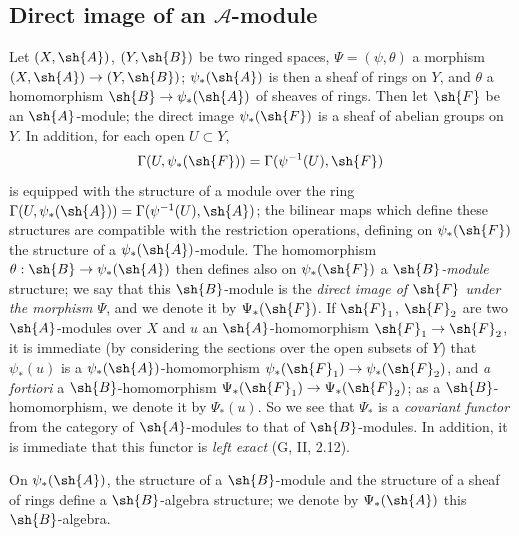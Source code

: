 \subsection{Direct image of an $\mathcal{A}$-module}
\label{subsection:0.4.2}

\begin{env}[4.2.1]
\label{0.4.2.1}
Let $(X,\sh{A})$, $(Y,\sh{B})$ be two ringed spaces, $\Psi=(\psi,\theta)$ a
morphism $(X,\sh{A})\to(Y,\sh{B})$; $\psi_*(\sh{A})$ is then a sheaf of rings on
$Y$, and $\theta$ a homomorphism $\sh{B}\to\psi_*(\sh{A})$ of sheaves of rings.
Then let $\sh{F}$ be an $\sh{A}$-module; the direct image $\psi_*(\sh{F})$ is a
sheaf of abelian groups on $Y$. In addition, for each open $U\subset Y$,
\[
  \Gamma(U,\psi_*(\sh{F}))=\Gamma(\psi^{-1}(U),\sh{F})
\]
is equipped with the structure of a module over the ring
$\Gamma(U,\psi_*(\sh{A}))=\Gamma(\psi^{-1}(U),\sh{A})$; the bilinear maps which
define these structures are compatible with the restriction operations, defining
on $\psi_*(\sh{F})$ the structure of a $\psi_*(\sh{A})$-module. The homomorphism
$\theta:\sh{B}\to\psi_*(\sh{A})$ then defines also on $\psi_*(\sh{F})$ a
\emph{$\sh{B}$-module} structure; we say that this
$\sh{B}$-module is the \emph{direct image of $\sh{F}$ under the morphism
$\Psi$}, and we denote it by $\Psi_*(\sh{F})$. If $\sh{F}_1$, $\sh{F}_2$ are two
$\sh{A}$-modules over $X$ and $u$ an $\sh{A}$-homomorphism
$\sh{F}_1\to\sh{F}_2$, it is immediate (by considering the sections over the
open subsets of $Y$) that $\psi_*(u)$ is a $\psi_*(\sh{A})$-homomorphism
$\psi_*(\sh{F}_1)\to\psi_*(\sh{F}_2)$, and \emph{a fortiori} a
$\sh{B}$-homomorphism $\Psi_*(\sh{F}_1)\to\Psi_*(\sh{F}_2)$; as a
$\sh{B}$-homomorphism, we denote it by $\Psi_*(u)$. So we see that $\Psi_*$ is a
\emph{covariant functor} from the category of $\sh{A}$-modules to that of
$\sh{B}$-modules. In addition, it is immediate that this functor is \emph{left
exact} (G, II, 2.12).

On $\psi_*(\sh{A})$, the structure of a $\sh{B}$-module and the structure of a
sheaf of rings define a $\sh{B}$-algebra structure; we denote by
$\Psi_*(\sh{A})$ this $\sh{B}$-algebra.
\end{env}

